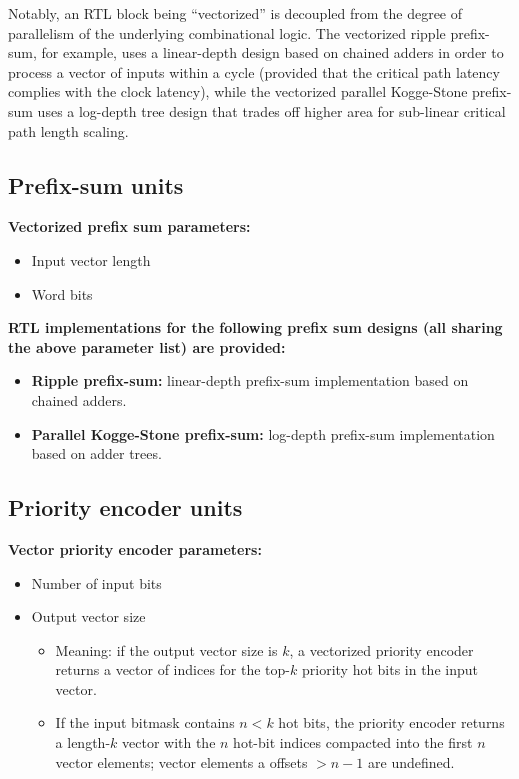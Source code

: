 Notably, an RTL block being ``vectorized'' is decoupled from the degree of parallelism of the underlying combinational logic. The vectorized ripple prefix-sum, for example, uses a linear-depth design based on chained adders in order to process a vector of inputs within a cycle (provided that the critical path latency complies with the clock latency), while the vectorized parallel Kogge-Stone prefix-sum uses a log-depth tree design that trades off higher area for sub-linear critical path length scaling.

\subsection{Prefix-sum units}

\textbf{Vectorized prefix sum parameters:}

\begin{itemize}
    \item Input vector length
    \item Word bits
\end{itemize}

\textbf{RTL implementations for the following prefix sum designs (all sharing the above parameter list) are provided:}

\begin{itemize}
    \item \textbf{Ripple prefix-sum:} linear-depth prefix-sum implementation based on chained adders.
    \item \textbf{Parallel Kogge-Stone prefix-sum:} log-depth prefix-sum implementation based on adder trees.
\end{itemize}

\subsection{Priority encoder units}

\textbf{Vector priority encoder parameters:}

\begin{itemize}
    \item Number of input bits
    \item Output vector size
    
    \begin{itemize}
        \item Meaning: if the output vector size is $k$, a vectorized priority encoder returns a vector of indices for the top-$k$ priority hot bits in the input vector. 
        \item If the input bitmask contains $n < k$ hot bits, the priority encoder returns a length-$k$ vector with the $n$ hot-bit indices compacted into the first $n$ vector elements; vector elements a offsets $>n-1$ are undefined.
    \end{itemize}

\end{itemize}

